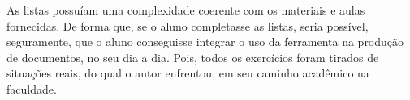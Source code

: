\documentclass[
12pt,				%
openright,			%
oneside,			%
a4paper,			%
english,			%
french,				%
spanish,			%
brazil,				%
]{abntex2}
\begin{document}
As listas possuíam uma complexidade coerente com os materiais e aulas
fornecidas. De forma que, se o aluno completasse as listas, seria
possível, seguramente, que o aluno conseguisse integrar o uso da
ferramenta na produção de documentos, no seu dia a dia. Pois, todos os
exercícios foram tirados de situações reais, do qual o autor
enfrentou, em seu caminho acadêmico na faculdade.




\end{document}
